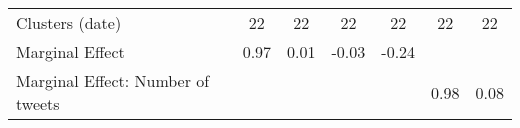 {\begin{tabular}{l*{6}{c}}
Clusters (date)     &          22         &          22         &          22         &          22         &          22         &          22         \\
Marginal Effect     &        0.97         &        0.01         &       -0.03         &       -0.24         &                     &                     \\
Marginal Effect: Number of tweets&                     &                     &                     &                     &        0.98         &        0.08         \\
\hline\hline
\end{tabular}
}
